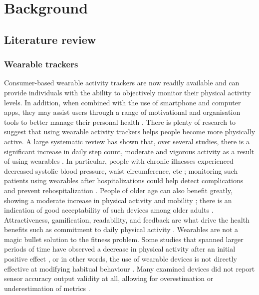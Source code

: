 \chapter{Background}
\label{cha:background}
\section{Literature review}
\subsection{Wearable trackers}
Consumer-based wearable activity trackers are now readily available and can provide individuals with the ability to objectively monitor their physical activity levels. In addition, when combined with the use of smartphone and computer apps, they may assist users through a range of motivational and organisation tools to better manage their personal health \cite{trackersBenefitGeneral}.
There is plenty of research to suggest that using wearable activity trackers helps people become more physically active. A large systematic review has shown that, over several studies, there is a significant increase in daily step count, moderate and vigorous activity as a result of using wearables \cite{trackersBenefitGeneral}. In particular, people with chronic illnesses experienced decreased systolic blood pressure, waist circumference, etc \cite {Franssen2020}; monitoring such patients using wearables after hospitalizations could help detect complications and prevent rehospitalization \cite{hospi}. People of older age can also benefit greatly, showing a moderate increase in physical activity and mobility \cite{SOliveira1188}; there is an indication of good acceptability of such devices among older adults \cite {Franssen2020}. Attractiveness, gamification, readability, and feedback are what drive the health benefits such as commitment to daily physical activity \cite{NELSON2016364}. Wearables are not a magic bullet solution to the fitness problem. Some studies that spanned larger periods of time have observed a decrease in physical activity after an initial positive effect \cite{Finkelstein2016}, or in other words, the use of wearable devices is not directly effective at modifying habitual behaviour \cite{LI2021104487}. Many examined devices did not report sensor accuracy output validity at all, allowing for overestimation or underestimation of metrics \cite{Lee2014ActivityTA}.
